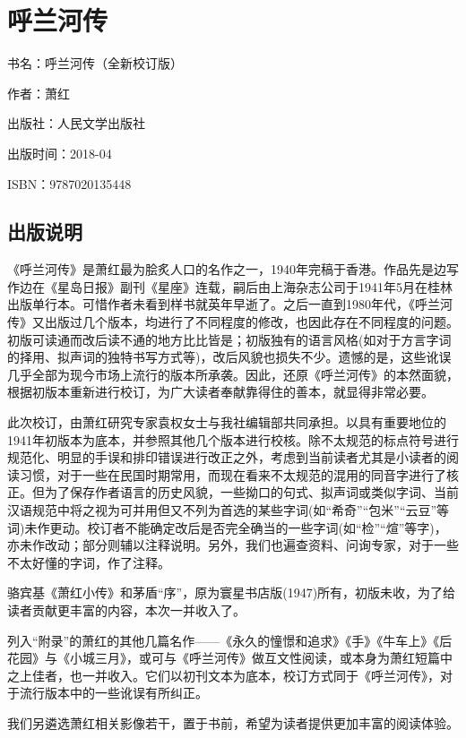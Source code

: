 





\section{呼兰河传}

\par 书名：呼兰河传（全新校订版）
\par 作者：萧红
\par 出版社：人民文学出版社
\par 出版时间：2018-04
\par ISBN：9787020135448



\subsection{出版说明}
\par 《呼兰河传》是萧红最为脍炙人口的名作之一，1940年完稿于香港。作品先是边写作边在《星岛日报》副刊《星座》连载，嗣后由上海杂志公司于1941年5月在桂林出版单行本。可惜作者未看到样书就英年早逝了。之后一直到1980年代，《呼兰河传》又出版过几个版本，均进行了不同程度的修改，也因此存在不同程度的问题。初版可读通而改后读不通的地方比比皆是；初版独有的语言风格(如对于方言字词的择用、拟声词的独特书写方式等)，改后风貌也损失不少。遗憾的是，这些讹误几乎全部为现今市场上流行的版本所承袭。因此，还原《呼兰河传》的本然面貌，根据初版本重新进行校订，为广大读者奉献靠得住的善本，就显得非常必要。
\par 此次校订，由萧红研究专家袁权女士与我社编辑部共同承担。以具有重要地位的1941年初版本为底本，并参照其他几个版本进行校核。除不太规范的标点符号进行规范化、明显的手误和排印错误进行改正之外，考虑到当前读者尤其是小读者的阅读习惯，对于一些在民国时期常用，而现在看来不太规范的混用的同音字进行了核正。但为了保存作者语言的历史风貌，一些拗口的句式、拟声词或类似字词、当前汉语规范中将之视为可并用但又不列为首选的某些字词(如“希奇”“包米”“云豆”等词)未作更动。校订者不能确定改后是否完全确当的一些字词(如“检”“煊”等字)，亦未作改动；部分则辅以注释说明。另外，我们也遍查资料、问询专家，对于一些不太好懂的字词，作了注释。
\par 骆宾基《萧红小传》和茅盾“序”，原为寰星书店版(1947)所有，初版未收，为了给读者贡献更丰富的内容，本次一并收入了。
\par 列入“附录”的萧红的其他几篇名作——《永久的憧憬和追求》《手》《牛车上》《后花园》与《小城三月》，或可与《呼兰河传》做互文性阅读，或本身为萧红短篇中之上佳者，也一并收入。它们以初刊文本为底本，校订方式同于《呼兰河传》，对于流行版本中的一些讹误有所纠正。
\par 我们另遴选萧红相关影像若干，置于书前，希望为读者提供更加丰富的阅读体验。
\par {}
\par {}


